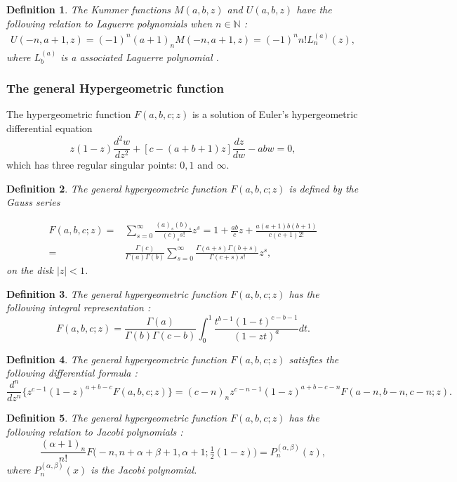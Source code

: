\documentclass[12pt]{article}
\def\N{\mathbb{N}}
\newtheorem{mydef1}{Definition}[section]
\numberwithin{figure}{section}
\numberwithin{equation}{section}
\numberwithin{table}{section}
\begin{document}
\begin{mydef1}
The Kummer functions $M(a,b,z)$ and $U(a,b,z)$ have the following relation to Laguerre polynomials when $n\in\N$ \cite[\S13.6(v)]{DLMF}:
\begin{align}
U(-n,a+1,z)=(-1)^n(a+1)_nM(-n,a+1,z)=(-1)^nn!L^{(a)}_n(z)\label{Laguerretrans},
\end{align}
where $L^{(a)}_b$ is a associated Laguerre polynomial \cite[\S18.3]{DLMF}.
\end{mydef1}
\subsubsection{The general Hypergeometric function}
The hypergeometric function $F(a,b,c;z)$ is a solution of Euler's hypergeometric differential equation
\begin{equation}\label{TGHFDE}
z(1-z)\frac{d^2w}{dz^2}+[c-(a+b+1)z]\frac{dz}{dw}-abw=0,
\end{equation}
which has three regular singular points: $0,1$ and $\infty$.
\begin{mydef1}
The general hypergeometric function $F(a,b,c;z)$ is defined by the Gauss series \cite[\S15.2(i)]{DLMF}

\begin{align*}
F(a,b,c;z)=&\sum^{\infty}_{s=0}\frac{(a)_s(b)_s}{(c)_s s!}z^s=1+\frac{ab}{c}z+\frac{a(a+1)b(b+1)}{c(c+1)2!}\\
=&\frac{\Gamma(c)}{\Gamma(a)\Gamma(b)}\sum^\infty_{s=0}\frac{\Gamma(a+s)\Gamma(b+s)}{\Gamma(c+s)s!}z^s,
\end{align*}
on the disk $|z|<1$.
\end{mydef1}
\begin{mydef1}
The general hypergeometric function $F(a,b,c;z)$ has the following integral representation \cite[\S15.6.1(i)]{DLMF}:
\begin{equation}
F(a,b,c;z)=\frac{\Gamma(a)}{\Gamma(b)\Gamma(c-b)}\int^1_0\frac{t^{b-1}(1-t)^{c-b-1}}{(1-zt)^a}dt.\label{hypint}
\end{equation}
\end{mydef1}
\begin{mydef1}
The general hypergeometric function $F(a,b,c;z)$ satisfies the following differential formula \cite[\S15.5]{DLMF}:
\begin{equation}
\frac{d^n}{dz^n}\bigg\{\!z^{c-1}(1-z)^{a+b-c}\!F(a,b,c;z)\!\bigg\}\!\!=\!(c-n)_nz^{c-n-1}(1-z)^{a+b-c-n}\!F(a-n,b-n,c-n;\!z).\label{DF1A}
\end{equation}
\end{mydef1}
\begin{mydef1}
The general hypergeometric function $F(a,b,c;z)$ has the following relation to Jacobi polynomials \cite[\S15.9]{DLMF}:
\begin{equation}
\frac{(\alpha+1)_n}{n!}F\big(-n,n+\alpha+\beta+1,\alpha+1;\tfrac{1}{2}(1-z)\big)=P_n^{(\alpha,\beta)}(z),
\end{equation}
where $P_n^{(\alpha,\beta)}(x)$ is the Jacobi polynomial.
\end{mydef1}
\end{document}
